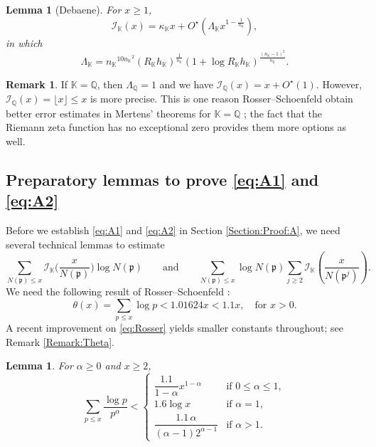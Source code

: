\documentclass[10pt,reqno]{amsart}
\theoremstyle{plain}
\newtheorem{lemma}[theorem]{Lemma}
\theoremstyle{definition}
\newtheorem{remark}[theorem]{Remark}
\newcommand{\Q}{\mathbb{Q}}
\newcommand{\K}{\mathbb{K}}
\newcommand{\PP}{\mathfrak{p}}
\newcommand{\I}{\mathcal{I}}
\begin{document}
\begin{lemma}[Debaene]\label{Lemma:Debaene}
For $x \geq 1$, 
\begin{equation*}
\I_{\K}(x) = \kappa_{\K} x + O^{\star}(\Lambda_{\K}x^{1-\frac{1}{n_{\K}}}),
\end{equation*}
in which
\begin{equation*}
\Lambda_{\K} = {n_{\K}}^{10 {n_{\K}}^2}(R_{\K}h_{\K})^{\frac{1}{n_{\K}}}(1 + \log{R_{\K} h_{\K}})^{\frac{(n_{\K}-1)^2}{n_{\K}}}.
\end{equation*}
\end{lemma}

\begin{remark}
If $\K= \Q$, then $\Lambda_{\Q} = 1$ and we have
$\I_{\Q}(x) = x + O^{\star}(1)$. However, $\I_{\Q}(x) = \lfloor x \rfloor \leq x$ is more precise.
This is one reason Rosser--Schoenfeld obtain better error estimates in Mertens' theorems for $\K = \Q$ \cite{Rosser};  the fact that the Riemann zeta function has no exceptional zero provides them 
more options as well.
\end{remark}

\subsection{Preparatory lemmas to prove \eqref{eq:A1} and \eqref{eq:A2}}

Before we establish \eqref{eq:A1} and \eqref{eq:A2} in Section \ref{Section:Proof:A}, we need 
several technical lemmas to estimate
\begin{equation*}
    \sum_{N(\PP)\leq x} \I_{\K} \bigg(\frac{x}{N(\PP)}\bigg) \log{N(\PP)}\qquad\text{and}\qquad\sum_{N(\PP)\leq x} \log{N(\PP)} \sum_{j\geq 2} \I_{\K} \left(\frac{x}{N(\PP^j)}\right).
\end{equation*}
We need the following result of Rosser--Schoenfeld \cite[Thm.~9]{Rosser}: 
\begin{equation}\label{eq:Rosser}
    \theta(x) = \sum_{p\leq x}\log p  < 1.01624x < 1.1x,
    \quad \text{for $x>0$}.
\end{equation}
A recent improvement on \eqref{eq:Rosser} yields smaller constants
throughout; see Remark \ref{Remark:Theta}.

\begin{lemma}\label{Lemma:Painful}
    For $\alpha \geq 0$ and $x \geq 2$, 
    \begin{equation*}
        \sum_{p\leq x} \frac{\log p}{p^{\alpha}}
        <
        \begin{cases}
            \dfrac{1.1}{1-\alpha}x^{1-\alpha} & \text{if $0 \leq \alpha \leq 1$},\\[10pt]
            1.6 \log x & \text{if $\alpha=1$},\\[5pt]
            \dfrac{1.1\,\alpha}{(\alpha - 1)2^{\alpha-1}}  & \text{if $\alpha > 1$}.
        \end{cases}
    \end{equation*}
\end{lemma}
\end{document}
